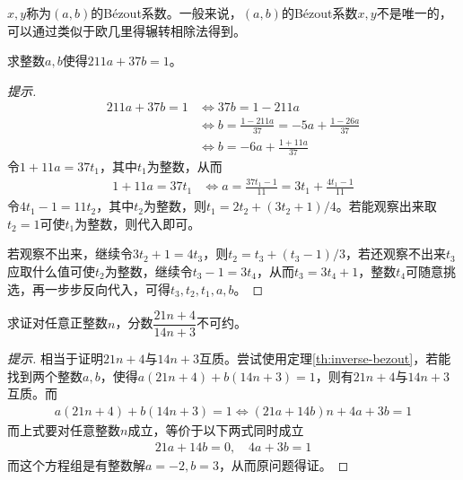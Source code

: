 $x,y$称为$(a,b)$的B\'ezout系数。一般来说，$(a,b)$的B\'ezout系数$x,y$不是唯一的，可以通过类似于欧几里得辗转相除法得到。

\begin{example}
  求整数$a,b$使得$211a+37b=1$。
\end{example}
\begin{proof}[提示]
\begin{align*}
  211a+37b=1 &\iff 37b=1-211a \\
             &\iff b=\frac{1-211a}{37}=-5a+\frac{1-26a}{37}\\
             &\iff b=-6a+\frac{1+11a}{37} 
\end{align*}
令$1+11a=37t_1$，其中$t_1$为整数，从而
\begin{align*}
  1+11a=37t_1 & \iff a=\frac{37t_1-1}{11}=3t_1 + \frac{4t_1-1}{11}
\end{align*}
令$4t_1-1=11t_2$，其中$t_2$为整数，则$t_1=2t_2+(3t_2+1)/4$。若能观察出来取$t_2=1$可使$t_1$为整数，则代入即可。

若观察不出来，继续令$3t_2+1=4t_3$，则$t_2=t_3+(t_3-1)/3$，若还观察不出来$t_3$应取什么值可使$t_2$为整数，继续令$t_3-1=3t_4$，从而$t_3=3t_4+1$，整数$t_4$可随意挑选，再一步步反向代入，可得$t_3,t_2,t_1,a,b$。
\end{proof}



\begin{example}[1959 IMO]
  求证对任意正整数$n$，分数$\dfrac{21n+4}{14n+3}$不可约。
\end{example}
\begin{proof}[提示]
  相当于证明$21n+4$与$14n+3$互质。尝试使用定理\ref{th:inverse-bezout}，若能找到两个整数$a,b$，使得$a(21n+4)+b(14n+3)=1$，则有$21n+4$与$14n+3$互质。而
  \begin{align*}
    a(21n+4)+b(14n+3)=1 \iff (21a + 14b)n + 4a + 3b = 1
  \end{align*}
  而上式要对任意整数$n$成立，等价于以下两式同时成立
  \begin{align*}
    21a+14b=0, \quad 4a+3b=1
  \end{align*}
  而这个方程组是有整数解$a=-2, b=3$，从而原问题得证。
\end{proof}

